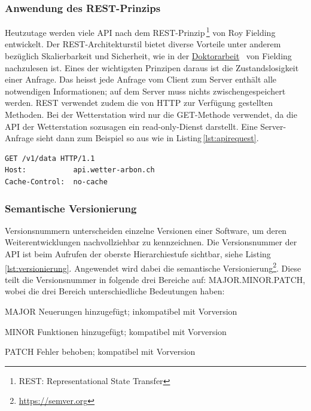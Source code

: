 \subsubsection{Anwendung des REST-Prinzips}
Heutzutage werden viele API nach dem REST-Prinzip\,\footnote{REST: Representational State Transfer} von Roy Fielding entwickelt. Der REST-Architekturstil bietet diverse Vorteile unter anderem bezüglich Skalierbarkeit und Sicherheit, wie in der \href{https://www.ics.uci.edu/~fielding/pubs/dissertation/top.htm}{Doktorarbeit}~\cite{Fielding:2000:ASD:932295} von Fielding nachzulesen ist. Eines der wichtigsten Prinzipen daraus ist die Zustandslosigkeit einer Anfrage. Das heisst jede Anfrage vom Client zum Server enthält alle notwendigen Informationen; auf dem Server muss nichts zwischengespeichert werden. REST verwendet zudem die von HTTP zur Verfügung gestellten Methoden\cite{LornaJaneMitchell2013oreilly}. Bei der Wetterstation wird nur die GET-Methode verwendet, da die API der Wetterstation sozusagen ein read-only-Dienst darstellt. Eine Server-Anfrage sieht dann zum Beispiel so aus wie in Listing\,\ref{lst:apirequest}.

\vspace{3mm}
\begin{lstlisting}[label=lst:apirequest,caption=Serveranfrage, language=HTML5, style=php]
GET /v1/data HTTP/1.1
Host:           api.wetter-arbon.ch
Cache-Control:  no-cache
\end{lstlisting}
\vspace{3mm}


\subsubsection{Semantische Versionierung}
Versionsnummern unterscheiden einzelne Versionen einer Software, um deren Weiterentwicklungen nachvollziehbar zu kennzeichnen. Die Versionsnummer der API ist beim Aufrufen der oberste Hierarchiestufe sichtbar, siehe Listing\,\ref{lst:versionierung}. Angewendet wird dabei die semantische Versionierung\footnote{\url{https://semver.org}}. Diese teilt die Versionsnummer in folgende drei Bereiche auf: MAJOR.MINOR.PATCH, wobei die drei Bereich unterschiedliche Bedeutungen haben:

\begin{description*}
  \item[MAJOR] Neuerungen hinzugefügt; inkompatibel mit Vorversion
  \item[MINOR] Funktionen hinzugefügt; kompatibel mit Vorversion
  \item[PATCH] Fehler behoben; kompatibel mit Vorversion
\end{description*}

